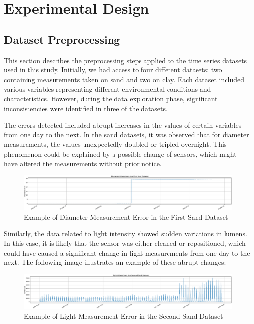 \chapter{Experimental Design}

\section{Dataset Preprocessing}

This section describes the preprocessing steps applied to the time series datasets used in this study. Initially, we had access to four different datasets: two containing measurements taken on sand and two on clay. Each dataset included various variables representing different environmental conditions and characteristics. However, during the data exploration phase, significant inconsistencies were identified in three of the datasets.

The errors detected included abrupt increases in the values of certain variables from one day to the next. In the sand datasets, it was observed that for diameter measurements, the values unexpectedly doubled or tripled overnight. This phenomenon could be explained by a possible change of sensors, which might have altered the measurements without prior notice.

\begin{figure}[htbp]
    \centering
    \includegraphics[width=15 cm]{5_ChapterDesign/figuras/1_DatasetIssues/Diameter_Sand_1}
    \caption{Example of Diameter Measurement Error in the First Sand Dataset}
    \end{figure}

Similarly, the data related to light intensity showed sudden variations in lumens. In this case, it is likely that the sensor was either cleaned or repositioned, which could have caused a significant change in light measurements from one day to the next. The following image illustrates an example of these abrupt changes:

\begin{figure}[htbp]
    \centering
    \includegraphics[width=15 cm]{5_ChapterDesign/figuras/1_DatasetIssues/Light_Sand_2}
    \caption{Example of Light Measurement Error in the Second Sand Dataset}
    \end{figure}

